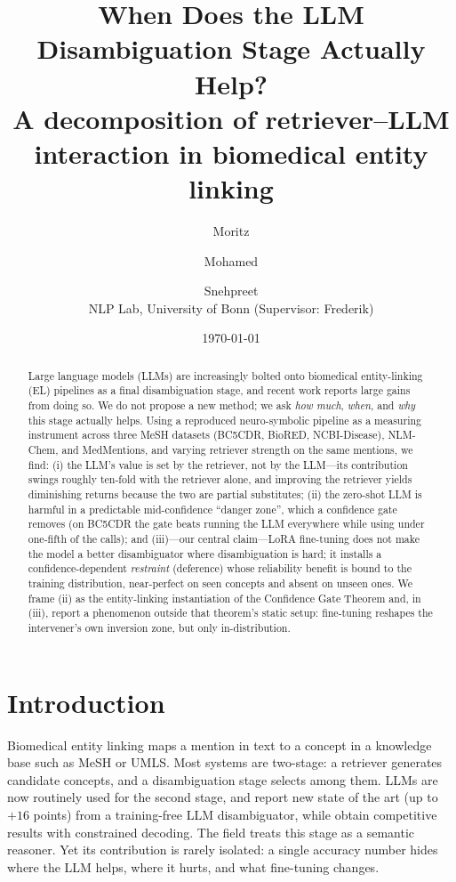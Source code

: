 \documentclass[11pt]{article}
\title{\textbf{When Does the LLM Disambiguation Stage Actually Help?}\\
\large A decomposition of retriever--LLM interaction in biomedical entity linking}
\author{Moritz \and Mohamed \and Snehpreet\\
\small NLP Lab, University of Bonn \quad (Supervisor: Frederik)}
\date{\today}
\begin{document}
\maketitle

\begin{abstract}
Large language models (LLMs) are increasingly bolted onto biomedical entity-linking
(EL) pipelines as a final disambiguation stage, and recent work reports large gains
from doing so. We do not propose a new method; we ask \emph{how much}, \emph{when}, and
\emph{why} this stage actually helps. Using a reproduced neuro-symbolic pipeline as a
measuring instrument across three MeSH datasets (BC5CDR, BioRED, NCBI-Disease),
NLM-Chem, and MedMentions, and varying retriever strength on the same mentions, we find:
(i) the LLM's value is set by the retriever, not by the LLM---its contribution swings
roughly ten-fold with the retriever alone, and improving the retriever yields
diminishing returns because the two are partial substitutes; (ii) the zero-shot LLM is
harmful in a predictable mid-confidence ``danger zone'', which a confidence gate removes
(on BC5CDR the gate beats running the LLM everywhere while using under one-fifth of the
calls); and (iii)---our central claim---LoRA fine-tuning does not make the model a better
disambiguator where disambiguation is hard; it installs a confidence-dependent
\emph{restraint} (deference) whose reliability benefit is bound to the training
distribution, near-perfect on seen concepts and absent on unseen ones. We frame (ii) as
the entity-linking instantiation of the Confidence Gate Theorem and, in (iii), report a
phenomenon outside that theorem's static setup: fine-tuning reshapes the intervener's
own inversion zone, but only in-distribution.
\end{abstract}

\section{Introduction}
Biomedical entity linking maps a mention in text to a concept in a knowledge base such
as MeSH or UMLS. Most systems are two-stage: a retriever generates candidate concepts,
and a disambiguation stage selects among them. LLMs are now routinely used for the second
stage, and \citet{ye2025} report new state of the art (up to $+16$ points) from a
training-free LLM disambiguator, while \citet{llm4bioel2025} obtain competitive results
with constrained decoding. The field treats this stage as a semantic reasoner. Yet its
contribution is rarely isolated: a single accuracy number hides where the LLM helps,
where it hurts, and what fine-tuning changes.
\end{document}
